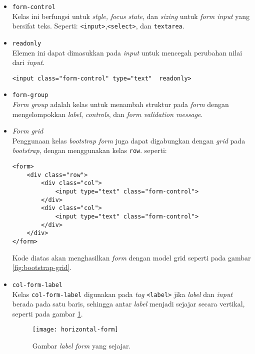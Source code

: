 \begin{itemize}
	\item \texttt{form-control} \\
	Kelas ini berfungsi untuk \textit{style, focus state}, dan \textit{sizing} untuk \textit{form input} yang bersifat teks. Seperti: \texttt{<input>},\texttt{<select>}, dan \texttt{textarea}.
	
	\item \texttt{readonly} \\
	Elemen ini dapat dimasukkan pada \textit{input} untuk mencegah perubahan nilai dari \textit{input}.			
	\begin{lstlisting}
<input class="form-control" type="text"  readonly>	
	\end{lstlisting}
	
	\item \texttt{form-group} \\
	\textit{Form group} adalah kelas untuk menambah struktur pada \textit{form} dengan mengelompokkan \textit{label}, \textit{controls}, dan \textit{form validation message}. 
	
	\item \textit{Form grid} \\
	Penggunaan kelas \textit{bootstrap form} juga dapat digabungkan dengan \textit{grid} pada \textit{bootstrap}, dengan menggunakan kelas \texttt{row}. seperti:
\begin{lstlisting}
<form>
	<div class="row">
		<div class="col">
			<input type="text" class="form-control">
		</div>
		<div class="col">
			<input type="text" class="form-control">
		</div>
	</div>
</form>
\end{lstlisting}
Kode diatas akan menghasilkan \textit{form} dengan model grid seperti pada gambar \ref{fig:bootstrap-grid}.

\item \texttt{col-form-label} \\ 
Kelas \texttt{col-form-label} digunakan pada \textit{tag} \texttt{<label>} jika \textit{label} dan \textit{input} berada pada satu baris, sehingga antar \textit{label} menjadi sejajar secara vertikal, seperti pada gambar \ref{fig:horizontal-form}.
\begin{figure}[H]
	\centering
	\texttt{[image: horizontal-form]}  	
	\caption[Gambar bootstrap-grid]{Gambar \textit{label form} yang sejajar.}
	\label{fig:horizontal-form}  
\end{figure}

\end{itemize}


